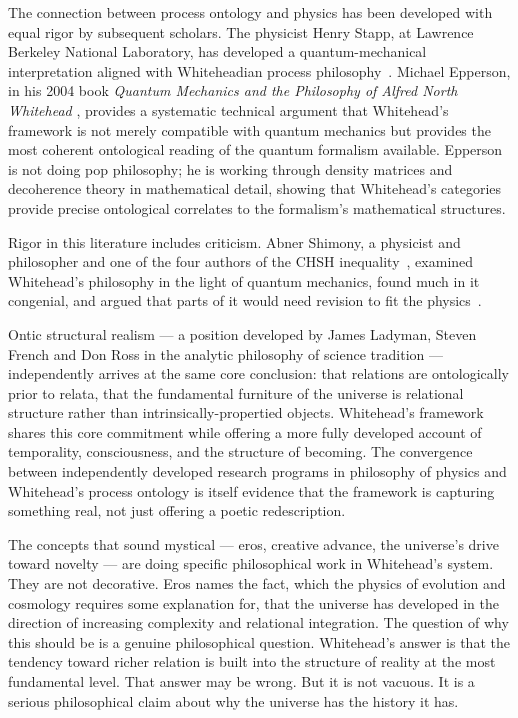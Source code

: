 The connection between process ontology and physics has been developed with equal rigor by subsequent scholars. The physicist Henry Stapp, at Lawrence Berkeley National Laboratory, has developed a quantum-mechanical interpretation aligned with Whiteheadian process philosophy~\citep{Stapp2007}. Michael Epperson, in his 2004 book \textit{Quantum Mechanics and the Philosophy of Alfred North Whitehead} \citep{Epperson2004}, provides a systematic technical argument that Whitehead's framework is not merely compatible with quantum mechanics but provides the most coherent ontological reading of the quantum formalism available. Epperson is not doing pop philosophy; he is working through density matrices and decoherence theory in mathematical detail, showing that Whitehead's categories provide precise ontological correlates to the formalism's mathematical structures.

Rigor in this literature includes criticism. Abner Shimony, a physicist and philosopher and one of the four authors of the CHSH inequality~\citep{CHSH1969}, examined Whitehead's philosophy in the light of quantum mechanics, found much in it congenial, and argued that parts of it would need revision to fit the physics~\citep{Shimony1993}.

Ontic structural realism --- a position developed by James Ladyman, Steven French and Don Ross in the analytic philosophy of science tradition --- independently arrives at the same core conclusion: that relations are ontologically prior to relata, that the fundamental furniture of the universe is relational structure rather than intrinsically-propertied objects. Whitehead's framework shares this core commitment while offering a more fully developed account of temporality, consciousness, and the structure of becoming. The convergence between independently developed research programs in philosophy of physics and Whitehead's process ontology is itself evidence that the framework is capturing something real, not just offering a poetic redescription.

The concepts that sound mystical --- eros, creative advance, the universe's drive toward novelty --- are doing specific philosophical work in Whitehead's system. They are not decorative. Eros names the fact, which the physics of evolution and cosmology requires some explanation for, that the universe has developed in the direction of increasing complexity and relational integration. The question of why this should be is a genuine philosophical question. Whitehead's answer is that the tendency toward richer relation is built into the structure of reality at the most fundamental level. That answer may be wrong. But it is not vacuous. It is a serious philosophical claim about why the universe has the history it has.


